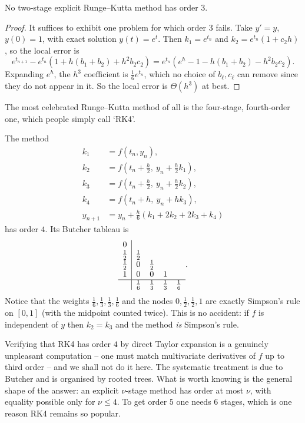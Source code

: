 \begin{proposition}
  No two-stage explicit Runge--Kutta method has order $3$.
\end{proposition}
\begin{proof}
  It suffices to exhibit one problem for which order $3$ fails. Take $y' = y$, $y(0) = 1$, with exact solution $y(t) = e^t$. Then $k_1 = e^{t_n}$ and $k_2 = e^{t_n}(1 + c_2h)$, so the local error is
  $$
  e^{t_{n+1}} - e^{t_n}\left(1 + h(b_1+b_2) + h^2b_2c_2\right) = e^{t_n}\left(e^h - 1 - h(b_1+b_2) - h^2 b_2c_2\right).
  $$
  Expanding $e^h$, the $h^3$ coefficient is $\tfrac16 e^{t_n}$, which no choice of $b_\ell, c_\ell$ can remove since they do not appear in it. So the local error is $\Theta(h^3)$ at best.
\end{proof}

The most celebrated Runge--Kutta method of all is the four-stage, fourth-order one, which people simply call `RK4'.

\begin{example}
  The method
  \begin{align*}
    k_1 &= f(t_n, y_n),\\
    k_2 &= f(t_n + \tfrac{h}{2},\ y_n + \tfrac{h}{2}k_1),\\
    k_3 &= f(t_n + \tfrac{h}{2},\ y_n + \tfrac{h}{2}k_2),\\
    k_4 &= f(t_n + h,\ y_n + hk_3),\\
    y_{n+1} &= y_n + \tfrac{h}{6}\left(k_1 + 2k_2 + 2k_3 + k_4\right)
  \end{align*}
  has order $4$. Its Butcher tableau is
  $$
  \begin{array}{c|cccc}
    0 & & & &\\
    \tfrac12 & \tfrac12 & & &\\
    \tfrac12 & 0 & \tfrac12 & &\\
    1 & 0 & 0 & 1 &\\\hline
      & \tfrac16 & \tfrac13 & \tfrac13 & \tfrac16
  \end{array}.
  $$
  Notice that the weights $\tfrac16, \tfrac13, \tfrac13, \tfrac16$ and the nodes $0, \tfrac12, \tfrac12, 1$ are exactly Simpson's rule on $[0,1]$ (with the midpoint counted twice). This is no accident: if $f$ is independent of $y$ then $k_2 = k_3$ and the method \emph{is} Simpson's rule.
\end{example}

\begin{remark}
  Verifying that RK4 has order $4$ by direct Taylor expansion is a genuinely unpleasant computation -- one must match multivariate derivatives of $f$ up to third order -- and we shall not do it here. The systematic treatment is due to Butcher and is organised by rooted trees. What is worth knowing is the general shape of the answer: an explicit $\nu$-stage method has order at most $\nu$, with equality possible only for $\nu \leq 4$. To get order $5$ one needs $6$ stages, which is one reason RK4 remains so popular.
\end{remark}

